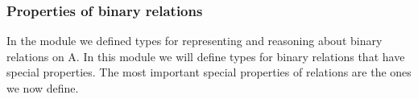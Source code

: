 \subsubsection{Properties of binary relations}\label{properties-of-binary-relations}

In the  module we defined types for representing and reasoning about binary relations on \ab A. In this module we will define types for binary relations that have special properties. The most important special properties of relations are the ones we now define.
\ccpad
\begin{code}%
\>[1]\AgdaSpace{}%
\AgdaSymbol{:}\AgdaSpace{}%
\AgdaSpace{}%
\AgdaSpace{}%
\AgdaSpace{}%
\AgdaSpace{}%
\AgdaSpace{}%
\AgdaSpace{}%
\AgdaSpace{}%
\<%
\\
%
\>[1]\AgdaSpace{}%
\AgdaSpace{}%
\AgdaSymbol{=}\AgdaSpace{}%
\AgdaSpace{}%
\AgdaSpace{}%
\AgdaSpace{}%
\AgdaSpace{}%
\AgdaSpace{}%
\<%
\\
%
\\[\AgdaEmptyExtraSkip]%
%
\>[1]\AgdaSpace{}%
\AgdaSymbol{:}\AgdaSpace{}%
\AgdaSpace{}%
\AgdaSpace{}%
\AgdaSpace{}%
\AgdaSpace{}%
\AgdaSpace{}%
\AgdaSpace{}%
\AgdaSpace{}%
\<%
\\
%
\>[1]\AgdaSpace{}%
\AgdaSpace{}%

\end{code}
